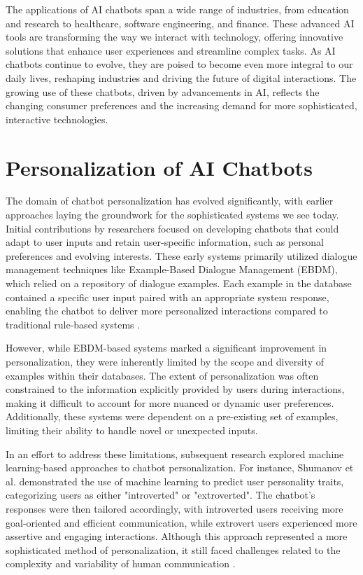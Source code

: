 The applications of AI chatbots span a wide range of industries, from education and research to healthcare, software engineering, and finance. These advanced AI tools are transforming the way we interact with technology, offering innovative solutions that enhance user experiences and streamline complex tasks. As AI chatbots continue to evolve, they are poised to become even more integral to our daily lives, reshaping industries and driving the future of digital interactions. The growing use of these chatbots, driven by advancements in AI, reflects the changing consumer preferences and the increasing demand for more sophisticated, interactive technologies.

\section{Personalization of AI Chatbots}

The domain of chatbot personalization has evolved significantly, with earlier approaches laying the groundwork for the sophisticated systems we see today. Initial contributions by researchers focused on developing chatbots that could adapt to user inputs and retain user-specific information, such as personal preferences and evolving interests. These early systems primarily utilized dialogue management techniques like Example-Based Dialogue Management (EBDM), which relied on a repository of dialogue examples. Each example in the database contained a specific user input paired with an appropriate system response, enabling the chatbot to deliver more personalized interactions compared to traditional rule-based systems \cite{kim2015acquisition, bang2015example}.

However, while EBDM-based systems marked a significant improvement in personalization, they were inherently limited by the scope and diversity of examples within their databases. The extent of personalization was often constrained to the information explicitly provided by users during interactions, making it difficult to account for more nuanced or dynamic user preferences. Additionally, these systems were dependent on a pre-existing set of examples, limiting their ability to handle novel or unexpected inputs.

In an effort to address these limitations, subsequent research explored machine learning-based approaches to chatbot personalization. For instance, Shumanov et al. demonstrated the use of machine learning to predict user personality traits, categorizing users as either "introverted" or "extroverted". The chatbot's responses were then tailored accordingly, with introverted users receiving more goal-oriented and efficient communication, while extrovert users experienced more assertive and engaging interactions. Although this approach represented a more sophisticated method of personalization, it still faced challenges related to the complexity and variability of human communication \cite{shumanov2021making}.

